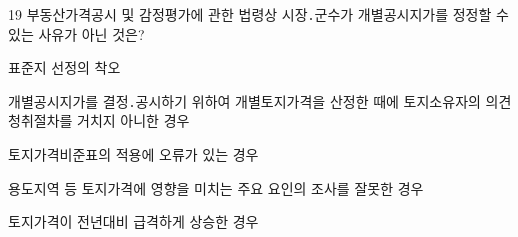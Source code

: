 \begin{question}{19}
부동산가격공시 및 감정평가에 관한 법령상 시장․군수가 개별공시지가를 정정할 수 있는 사유가 아닌 것은?
\begin{choices}
  \item 표준지 선정의 착오
  \item 개별공시지가를 결정․공시하기 위하여 개별토지가격을 산정한 때에 토지소유자의 의견청취절차를 거치지 아니한 경우
  \item 토지가격비준표의 적용에 오류가 있는 경우
  \item 용도지역 등 토지가격에 영향을 미치는 주요 요인의 조사를 잘못한 경우
  \item 토지가격이 전년대비 급격하게 상승한 경우
\end{choices}
\end{question}
